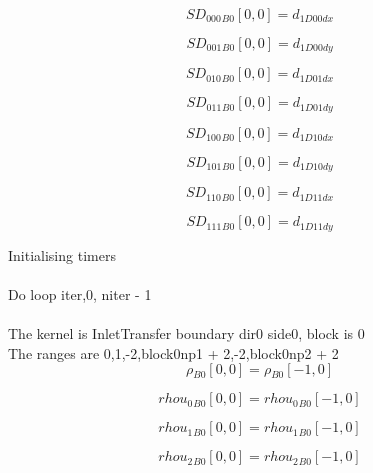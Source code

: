 \documentclass{article}
\begin{document}
\begin{dmath}{SD_{000}{_{B0}}}[{0,0}] = d_{1 D00 dx}\end{dmath}

\begin{dmath}{SD_{001}{_{B0}}}[{0,0}] = d_{1 D00 dy}\end{dmath}

\begin{dmath}{SD_{010}{_{B0}}}[{0,0}] = d_{1 D01 dx}\end{dmath}

\begin{dmath}{SD_{011}{_{B0}}}[{0,0}] = d_{1 D01 dy}\end{dmath}

\begin{dmath}{SD_{100}{_{B0}}}[{0,0}] = d_{1 D10 dx}\end{dmath}

\begin{dmath}{SD_{101}{_{B0}}}[{0,0}] = d_{1 D10 dy}\end{dmath}

\begin{dmath}{SD_{110}{_{B0}}}[{0,0}] = d_{1 D11 dx}\end{dmath}

\begin{dmath}{SD_{111}{_{B0}}}[{0,0}] = d_{1 D11 dy}\end{dmath}

\noindent Initialising timers\\
\\\noindent Do loop iter,0, niter - 1\\
\\\noindent The kernel is InletTransfer boundary dir0 side0, block is 0\\\noindent The ranges are 0,1,-2,block0np1 + 2,-2,block0np2 + 2\\\begin{dmath}{\rho{_{B0}}}[{0,0}] = {\rho{_{B0}}}[{-1,0}]\end{dmath}

\begin{dmath}{rhou_{0}{_{B0}}}[{0,0}] = {rhou_{0}{_{B0}}}[{-1,0}]\end{dmath}

\begin{dmath}{rhou_{1}{_{B0}}}[{0,0}] = {rhou_{1}{_{B0}}}[{-1,0}]\end{dmath}

\begin{dmath}{rhou_{2}{_{B0}}}[{0,0}] = {rhou_{2}{_{B0}}}[{-1,0}]\end{dmath}
\end{document}

